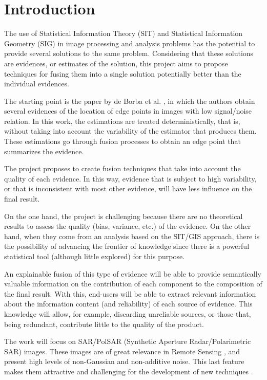 \chapter{Introduction}\label{chp:int}

The use of Statistical Information Theory (SIT) and Statistical Information Geometry (SIG) in image processing and analysis problems has the potential to provide several solutions to the same problem. Considering that these solutions are evidences, or estimates of the solution, this project aims to propose techniques for fusing them into a single solution potentially better than the individual evidences.

The starting point is the paper by de Borba et al. \cite{de2020fusion}, in which the authors obtain several evidences of the location of edge points in images with low signal/noise relation. In this work, the estimations are treated deterministically, that is, without taking into account the variability of the estimator that produces them. These estimations go through fusion processes to obtain an edge point that summarizes the evidence.

The project proposes to create fusion techniques that take into account the quality of each evidence. In this way, evidence that is subject to high variability, or that is inconsistent with most other evidence, will have less influence on the final result.

On the one hand, the project is challenging because there are no theoretical results to assess the quality (bias, variance, etc.) of the evidence. On the other hand, when they come from an analysis based on the SIT/GIS approach, there is the possibility of advancing the frontier of knowledge since there is a powerful statistical tool (although little explored) for this purpose.

An explainable fusion of this type of evidence will be able to provide semantically valuable information on the contribution of each component to the composition of the final result. With this, end-users will be able to extract relevant information about the information content (and reliability) of each source of evidence. This knowledge will allow, for example, discarding unreliable sources, or those that, being redundant, contribute little to the quality of the product.

The work will focus on SAR/PolSAR (Synthetic Aperture Radar/Polarimetric SAR) images. These images are of great relevance in Remote Sensing \cite{cloude2009polarisation}, and present high levels of non-Gaussian and non-additive noise. This last feature makes them attractive and challenging for the development of new techniques \cite{lee2017polarimetric}.

